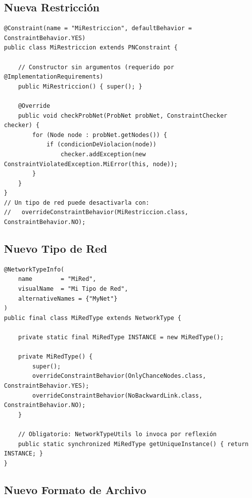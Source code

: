\documentclass[12pt,a4paper,spanish]{article}
\begin{document}
\subsection{Nueva Restricción}

\begin{lstlisting}[language=JavaPlugin, caption={Implementación de una nueva restricción}]
@Constraint(name = "MiRestriccion", defaultBehavior = ConstraintBehavior.YES)
public class MiRestriccion extends PNConstraint {

    // Constructor sin argumentos (requerido por @ImplementationRequirements)
    public MiRestriccion() { super(); }

    @Override
    public void checkProbNet(ProbNet probNet, ConstraintChecker checker) {
        for (Node node : probNet.getNodes()) {
            if (condicionDeViolacion(node))
                checker.addException(new ConstraintViolatedException.MiError(this, node));
        }
    }
}
// Un tipo de red puede desactivarla con:
//   overrideConstraintBehavior(MiRestriccion.class, ConstraintBehavior.NO);
\end{lstlisting}

\subsection{Nuevo Tipo de Red}

\begin{lstlisting}[language=JavaPlugin, caption={Implementación de un nuevo tipo de red}]
@NetworkTypeInfo(
    name        = "MiRed",
    visualName  = "Mi Tipo de Red",
    alternativeNames = {"MyNet"}
)
public final class MiRedType extends NetworkType {

    private static final MiRedType INSTANCE = new MiRedType();

    private MiRedType() {
        super();
        overrideConstraintBehavior(OnlyChanceNodes.class, ConstraintBehavior.YES);
        overrideConstraintBehavior(NoBackwardLink.class, ConstraintBehavior.NO);
    }

    // Obligatorio: NetworkTypeUtils lo invoca por reflexión
    public static synchronized MiRedType getUniqueInstance() { return INSTANCE; }
}
\end{lstlisting}

\subsection{Nuevo Formato de Archivo}
\end{document}

